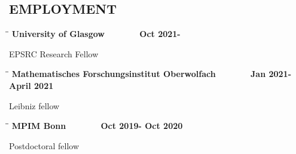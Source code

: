 \documentclass{res}
\begin{document}
 


\address{E-mail: adam.morgan@glasgow.ac.uk \\Date of birth: October 24, 1989\\ Webpage: amorgan516.github.io}
                                  
\begin{resume}       
 
 \section{EMPLOYMENT}       

\bigskip 

\vspace{-0.1in}	
   \begin{tabbing}
   \hspace{2in}\= \hspace{2in}\= \kill %
    {\bf University of Glasgow}\>~\> ~~~~~~ {\bf Oct 2021- }\\
   \end{tabbing}\vspace{-20pt}      %
     EPSRC Research Fellow

\vspace{-0.1in}	
   \begin{tabbing}
   \hspace{2in}\= \hspace{2in}\= \kill %
    {\bf Mathematisches Forschungsinstitut Oberwolfach}\>~\> ~~~~~~ {\bf Jan 2021- April 2021 }\\
   \end{tabbing}\vspace{-20pt}      %
     Leibniz  fellow  

\vspace{-0.1in}	
   \begin{tabbing}
   \hspace{2in}\= \hspace{2in}\= \kill %
    {\bf MPIM Bonn}\>~\> ~~~~~~ {\bf Oct 2019- Oct 2020}\\
   \end{tabbing}\vspace{-20pt}      %
      Postdoctoral fellow  


\end{resume}
\end{document}
